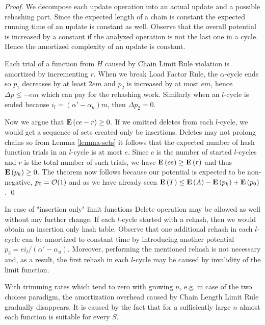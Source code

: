 \begin{proof}
We decompose each update operation into an actual update and a possible rehashing part. Since the expected length of a chain is constant the expected running time of an update is constant as well. Observe that the overall potential is increased by a constant if the analyzed operation is not the last one in a cycle. Hence the amortized complexity of an update is constant. 

Each trial of a function from $H$ caused by Chain Limit Rule violation is amortized by incrementing $r$. When we break Load Factor Rule, the $\alpha$-cycle ends so $p_1$ decreases by at least $2em$ and $p_2$ is increased by at most $em$, hence $\Delta p \leq -em$ which can pay for the rehashing work. Similarly when an $l$-cycle is ended because $i_l = (\alpha' - \alpha_u)m$, then $\Delta p_2 = 0$. 

Now we argue that $\mathbf{E}\left(ce - r\right) \geq 0$. If we omitted deletes from each $l$-cycle, we would get a sequence of sets created only be insertions. Deletes may not prolong chains so from Lemma \ref{lemma-sets} it follows that the expected number of hash function trials in an $l$-cycle is at most $e$. Since $c$ is the number of started $l$-cycles and $r$ is the total number of such trials, we have $\mathbf{E}\left(ce\right) \geq \mathbf{E}\left(r\right)$ and thus $\mathbf{E}\left(p_k\right) \geq 0$. The theorem now follows because our potential is expected to be non-negative, $p_0 = \mathcal{O}(1)$ and as we have already seen $\mathbf{E}\left(T\right) \leq \mathbf{E}\left(A\right) - \mathbf{E}\left(p_k\right) + \mathbf{E}\left(p_0\right)$.
\qed
\end{proof}

In case of "insertion only" limit functions Delete operation may be allowed as well without any further change. If each $l$-cycle started with a rehash, then we would obtain an insertion only hash table. Observe that one additional rehash in each $l$-cycle can be amortized to constant time by introducing another potential $p_3 = {ei_{l}}/{(\alpha' - \alpha_u)}$. Moreover, performing the mentioned rehash is not necessary and, as a result, the first rehash in each $l$-cycle may be caused by invalidity of the limit function.

With trimming rates which tend to zero with growing $n$, e.g. in case of the two choices paradigm, the amortization overhead caused by Chain Length Limit Rule gradually disappears. It is caused by the fact that for a sufficiently large $n$ almost each function is suitable for every $S$.
